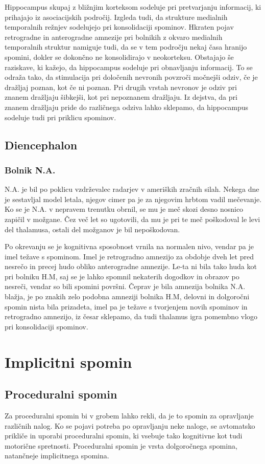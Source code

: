 \documentclass[10pt,a4paper]{article}
\begin{document}
Hippocampus skupaj z bližnjim korteksom sodeluje pri pretvarjanju informacij, ki prihajajo iz asociacijskih področij. Izgleda tudi, da strukture medialnih temporalnih režnjev sodelujejo pri konsolidaciji spominov. Hkraten pojav retrogradne in anterogradne amnezije pri bolnikih z okvaro medialnih temporalnih struktur namiguje tudi, da se v tem področju nekaj časa hranijo spomini, dokler se dokončno ne konsolidirajo v neokorteksu. Obstajajo še raziskave, ki kažejo, da hippocampus sodeluje pri obnavljanju informacij. To se odraža tako, da stimulacija pri določenih nevronih povzroči močnejši odziv, če je dražljaj poznan, kot če ni poznan. Pri drugih vrstah nevronov je odziv pri znanem dražljaju šibkejši, kot pri nepoznanem dražljaju. Iz dejstva, da pri znanem dražljaju pride do različnega odziva lahko sklepamo, da hippocampus sodeluje tudi pri priklicu spominov.

\subsection{Diencephalon}
\subsubsection{Bolnik N.A.}
N.A. je bil po poklicu vzdrževalec radarjev v ameriških zračnih silah. Nekega dne je sestavljal model letala, njegov cimer pa je za njegovim hrbtom vadil mečevanje. Ko se je N.A. v nepravem trenutku obrnil, se mu je meč skozi desno nosnico zapičil v možgane. Čez več let so ugotovili, da mu je pri te meč poškodoval le levi del thalamusa, ostali del možganov je bil nepoškodovan.

Po okrevanju se je kognitivna sposobnost vrnila na normalen nivo, vendar pa je imel težave s spominom. Imel je retrogradno amnezijo za obdobje dveh let pred nesrečo in precej hudo obliko anterogradne amnezije. Le-ta ni bila tako huda kot pri bolniku H.M, saj se je lahko spomnil nekaterih dogodkov in obrazov po nesreči, vendar so bili spomini površni. Čeprav je bila amnezija bolnika N.A. blažja, je po znakih zelo podobna amneziji bolnika H.M, delovni in dolgoročni spomin nista bila prizadeta, imel pa je težave s tvorjenjem novih spominov in retrogradno amnezijo, iz česar sklepamo, da tudi thalamus igra pomembno vlogo pri konsolidaciji spominov.

\section{Implicitni spomin}
\subsection{Proceduralni spomin}
Za proceduralni spomin bi v grobem lahko rekli, da je to spomin za opravljanje različnih nalog. Ko se pojavi potreba po opravljanju neke naloge, se avtomatsko prikliče in uporabi proceduralni spomin, ki vsebuje tako kognitivne kot tudi motorične spretnosti. Proceduralni spomin je vrsta dolgoročnega spomina, natančneje implicitnega spomina.
\end{document}
